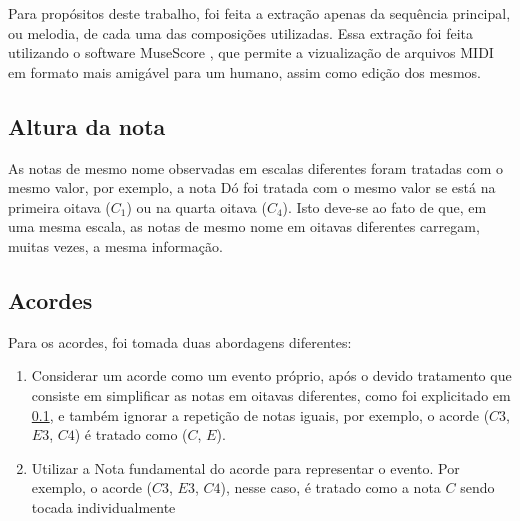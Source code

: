 Para propósitos deste trabalho, foi feita a extração apenas da sequência principal, ou melodia, de cada uma das composições utilizadas. Essa extração foi feita utilizando o software MuseScore \cite{musescore}, que permite a vizualização de arquivos MIDI em formato mais amigável para um humano, assim como edição dos mesmos.



\subsection{Altura da nota}\label{section:altura_da_nota}

As notas de mesmo nome observadas em escalas diferentes foram tratadas com o mesmo valor, por exemplo, a nota Dó foi tratada com o mesmo valor se está na primeira oitava ($C_1$) ou na quarta oitava ($C_4$). Isto deve-se ao fato de que, em uma mesma escala, as notas de mesmo nome em oitavas diferentes carregam, muitas vezes, a mesma informação.

\subsection{Acordes}

Para os acordes, foi tomada duas abordagens diferentes:

\begin{enumerate}
    \item Considerar um acorde como um evento próprio, após o devido tratamento que consiste em simplificar as notas em oitavas diferentes, como foi explicitado em \ref{section:altura_da_nota}, e também ignorar a repetição de notas iguais, por exemplo, o acorde ($C3$, $E3$, $C4$) é tratado como ($C$, $E$).

    \item Utilizar a Nota fundamental do acorde para representar o evento. Por exemplo, o acorde ($C3$, $E3$, $C4$), nesse caso, é tratado como a nota $C$ sendo tocada individualmente
\end{enumerate}

